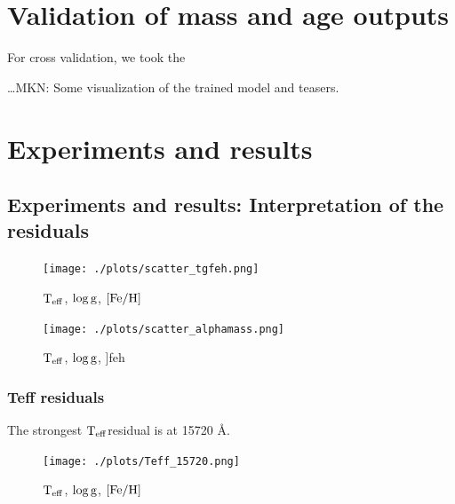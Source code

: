 \documentclass[12pt, preprint]{aastex}
\newcommand{\teff}{\mbox{$\rm T_{eff}$}}
\newcommand{\feh}{\mbox{$\rm [Fe/H]$}}
\newcommand{\logg}{\mbox{$\rm \log g$}}
\begin{document}
\section{Validation of mass and age outputs}

For cross validation, we took the 




\ldots MKN: Some visualization of the trained model and teasers.

\section{Experiments and results}

\subsection{Experiments and results: Interpretation of the residuals}


\begin{figure}[p!]
\centering
    \texttt{[image: ./plots/scatter\_tgfeh.png]}
  \caption{\teff, \logg, \feh}
\label{fig:validation}
\end{figure}


\begin{figure}[p!]
\centering
    \texttt{[image: ./plots/scatter\_alphamass.png]}
  \caption{\teff, \logg, ]feh}
\label{fig:validation}
\end{figure}

\subsubsection{Teff residuals}

The strongest \teff residual is at 15720 \AA. 

\begin{figure}[p!]
\centering
    \texttt{[image: ./plots/Teff\_15720.png]}
  \caption{\teff, \logg, \feh}
\label{fig:validation}
\end{figure}
\end{document}
